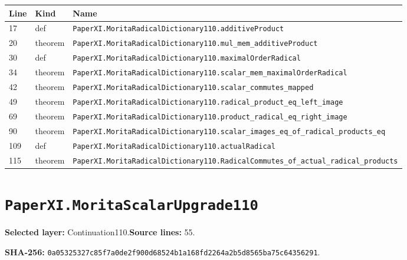 \documentclass[10pt,oneside]{book}
\begin{document}
\begin{longtable}{@{}p{}p{}p{}@{}}\toprule Line&Kind&Name\\\midrule\endhead

17&def&\nolinkurl{PaperXI.MoritaRadicalDictionary110.additiveProduct}\\

20&theorem&\nolinkurl{PaperXI.MoritaRadicalDictionary110.mul_mem_additiveProduct}\\

30&def&\nolinkurl{PaperXI.MoritaRadicalDictionary110.maximalOrderRadical}\\

34&theorem&\nolinkurl{PaperXI.MoritaRadicalDictionary110.scalar_mem_maximalOrderRadical}\\

42&theorem&\nolinkurl{PaperXI.MoritaRadicalDictionary110.scalar_commutes_mapped}\\

49&theorem&\nolinkurl{PaperXI.MoritaRadicalDictionary110.radical_product_eq_left_image}\\

69&theorem&\nolinkurl{PaperXI.MoritaRadicalDictionary110.product_radical_eq_right_image}\\

90&theorem&\nolinkurl{PaperXI.MoritaRadicalDictionary110.scalar_images_eq_of_radical_products_eq}\\

109&def&\nolinkurl{PaperXI.MoritaRadicalDictionary110.actualRadical}\\

115&theorem&\nolinkurl{PaperXI.MoritaRadicalDictionary110.RadicalCommutes_of_actual_radical_products}\\

\bottomrule\end{longtable}

\section{\texorpdfstring{\nolinkurl{PaperXI.MoritaScalarUpgrade110}}{PaperXI.MoritaScalarUpgrade110}}\label{module:PaperXI.MoritaScalarUpgrade110}

\textbf{Selected layer:} Continuation110.\quad\textbf{Source lines:} 55.\par\textbf{SHA-256:} {\scriptsize\nolinkurl{0a05325327c85f7a0de2f900d68524b1a168fd2264a2b5d8565ba75c64356291}}.
\end{document}

